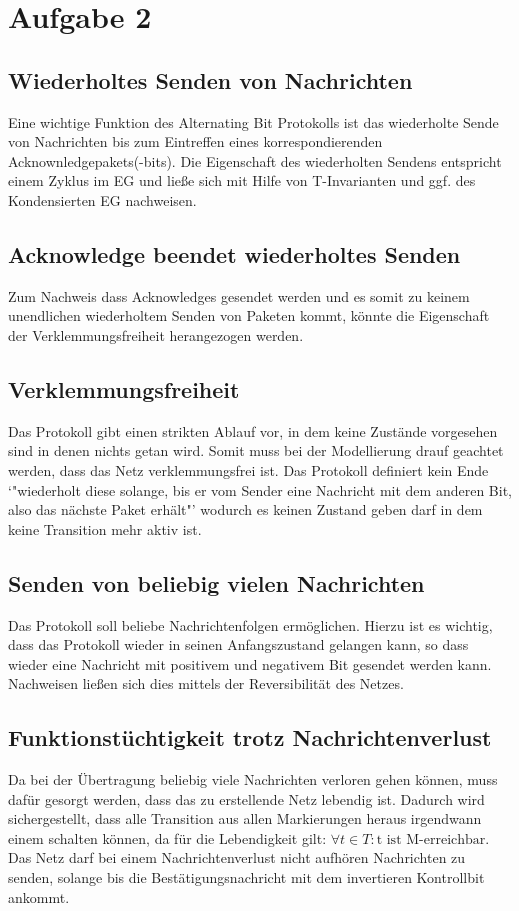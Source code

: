 \documentclass[10pt]{scrartcl}
\begin{document}
\section{Aufgabe 2}


\subsection{Wiederholtes Senden von Nachrichten}
Eine wichtige Funktion des Alternating Bit Protokolls ist das wiederholte Sende von Nachrichten bis zum Eintreffen eines korrespondierenden Acknownledgepakets(-bits).
Die Eigenschaft des wiederholten Sendens entspricht einem Zyklus im EG und ließe sich mit Hilfe von T-Invarianten und ggf. des Kondensierten EG nachweisen.

\subsection{Acknowledge beendet wiederholtes Senden}
Zum Nachweis dass Acknowledges gesendet werden und es somit zu keinem unendlichen wiederholtem Senden von Paketen kommt, könnte die Eigenschaft der Verklemmungsfreiheit herangezogen werden.

\subsection{Verklemmungsfreiheit}
Das Protokoll gibt einen strikten Ablauf vor, in dem  keine Zustände vorgesehen sind in denen nichts getan wird. Somit muss bei der Modellierung drauf geachtet werden, dass das Netz verklemmungsfrei ist. Das Protokoll definiert kein Ende `"wiederholt diese solange, bis er vom Sender eine Nachricht mit dem anderen Bit, also das nächste Paket erhält"' wodurch es keinen Zustand geben darf in dem keine Transition mehr aktiv ist.

\subsection{Senden von beliebig vielen Nachrichten}
Das Protokoll soll beliebe Nachrichtenfolgen ermöglichen.
Hierzu ist es wichtig, dass das Protokoll wieder in seinen Anfangszustand gelangen kann, so dass wieder eine Nachricht mit positivem und negativem Bit gesendet werden kann.
Nachweisen ließen sich dies mittels der Reversibilität des Netzes.

\subsection{Funktionstüchtigkeit trotz Nachrichtenverlust}
Da bei der Übertragung beliebig viele Nachrichten verloren gehen können, muss dafür gesorgt werden, dass das zu erstellende Netz lebendig ist. Dadurch wird sichergestellt, dass alle Transition aus allen Markierungen heraus irgendwann einem schalten können, da für die Lebendigkeit gilt: $\forall t \in T : \text{t ist M-erreichbar}$. Das Netz darf bei einem Nachrichtenverlust nicht aufhören Nachrichten zu senden, solange bis die Bestätigungsnachricht mit dem invertieren Kontrollbit ankommt.
\end{document}
